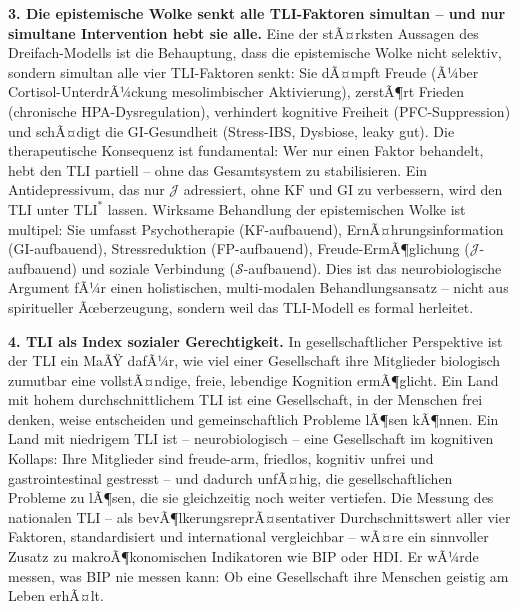 ﻿\documentclass[12pt,a4paper]{report}
\theoremstyle{plain}
\theoremstyle{definition}
\theoremstyle{remark}
\begin{document}
	\textbf{3. Die epistemische Wolke senkt alle TLI-Faktoren simultan --
		und nur simultane Intervention hebt sie alle.}
	Eine der stÃ¤rksten Aussagen des Dreifach-Modells ist die Behauptung,
	dass die epistemische Wolke nicht selektiv, sondern simultan
	alle vier TLI-Faktoren senkt:
	Sie dÃ¤mpft Freude (Ã¼ber Cortisol-UnterdrÃ¼ckung mesolimbischer
	Aktivierung), zerstÃ¶rt Frieden (chronische HPA-Dysregulation),
	verhindert kognitive Freiheit (PFC-Suppression) und
	schÃ¤digt die GI-Gesundheit (Stress-IBS, Dysbiose, leaky gut).
	Die therapeutische Konsequenz ist fundamental: Wer nur einen
	Faktor behandelt, hebt den TLI partiell -- ohne
	das Gesamtsystem zu stabilisieren.
	Ein Antidepressivum, das nur $\mathcal{J}$ adressiert,
	ohne $\mathrm{KF}$ und $\mathrm{GI}$ zu verbessern,
	wird den TLI unter $\mathrm{TLI}^*$ lassen.
	Wirksame Behandlung der epistemischen Wolke ist multipel:
	Sie umfasst Psychotherapie (KF-aufbauend), ErnÃ¤hrungsinformation
	(GI-aufbauend), Stressreduktion (FP-aufbauend), Freude-ErmÃ¶glichung
	($ \mathcal{J}$-aufbauend) und soziale Verbindung ($\mathcal{S}$-aufbauend).
	Dies ist das neurobiologische Argument fÃ¼r einen holistischen,
	multi-modalen Behandlungsansatz -- nicht aus spiritueller
	Ãœberzeugung, sondern weil das TLI-Modell es formal herleitet.

	\textbf{4. TLI als Index sozialer Gerechtigkeit.}
	In gesellschaftlicher Perspektive ist der TLI ein MaÃŸ dafÃ¼r,
	wie viel einer Gesellschaft ihre Mitglieder biologisch zumutbar
	eine vollstÃ¤ndige, freie, lebendige Kognition ermÃ¶glicht.
	Ein Land mit hohem durchschnittlichem TLI ist eine Gesellschaft,
	in der Menschen frei denken, weise entscheiden und
	gemeinschaftlich Probleme lÃ¶sen kÃ¶nnen.
	Ein Land mit niedrigem TLI ist -- neurobiologisch -- eine
	Gesellschaft im kognitiven Kollaps: Ihre Mitglieder sind
	freude-arm, friedlos, kognitiv unfrei und gastrointestinal
	gestresst -- und dadurch unfÃ¤hig, die gesellschaftlichen
	Probleme zu lÃ¶sen, die sie gleichzeitig noch weiter vertiefen.
	Die Messung des nationalen TLI -- als bevÃ¶lkerungs\-reprÃ¤\-sentativer
	Durchschnittswert aller vier Faktoren, standardisiert und
	international vergleichbar -- wÃ¤re ein sinnvoller Zusatz
	zu makroÃ¶konomischen Indikatoren wie BIP oder HDI.
	Er wÃ¼rde messen, was BIP nie messen kann:
	Ob eine Gesellschaft ihre Menschen geistig am Leben erhÃ¤lt.
\end{document}
